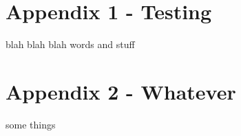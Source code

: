\newpage

\section{Appendix 1 - Testing}\label{appendix-1---testing}

blah blah blah words and stuff

\newpage

\section{Appendix 2 - Whatever}\label{appendix-2---whatever}

some things
